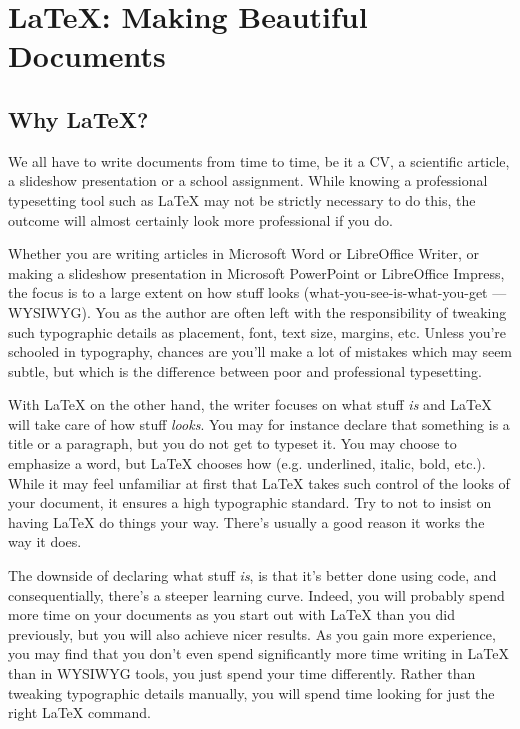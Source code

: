 \chapter{\LaTeX: Making Beautiful Documents}\label{ch:latex}

\section{Why \LaTeX?}
We all have to write documents from time to time, be it a CV, a scientific article, a slideshow presentation or a school assignment. While knowing a professional typesetting tool such as \LaTeX{} may not be strictly necessary to do this, the outcome will almost certainly look more professional if you do.

Whether you are writing articles in Microsoft Word or LibreOffice Writer, or making a slideshow presentation in Microsoft PowerPoint or LibreOffice Impress, the focus is to a large extent on how stuff looks (what-you-see-is-what-you-get --- WYSIWYG). You as the author are often left with the responsibility of tweaking such typographic details as placement, font, text size, margins, etc. Unless you're schooled in typography, chances are you'll make a lot of mistakes which may seem subtle, but which is the difference between poor and professional typesetting.

With \LaTeX{} on the other hand, the writer focuses on what stuff \emph{is} and \LaTeX{} will take care of how stuff \emph{looks}. You may for instance declare that something is a title or a paragraph, but you do not get to typeset it. You may choose to emphasize a word, but \LaTeX{} chooses how (e.g. underlined, italic, bold, etc.). While it may feel unfamiliar at first that \LaTeX{} takes such control of the looks of your document, it ensures a high typographic standard. Try to not to insist on having \LaTeX{} do things your way. There's usually a good reason it works the way it does.

The downside of declaring what stuff \emph{is}, is that it's better done using code, and consequentially, there's a steeper learning curve. Indeed, you will probably spend more time on your documents as you start out with \LaTeX{} than you did previously, but you will also achieve nicer results. As you gain more experience, you may find that you don't even spend significantly more time writing in \LaTeX{} than in WYSIWYG tools, you just spend your time differently. Rather than tweaking typographic details manually, you will spend time looking for just the right \LaTeX{} command.

